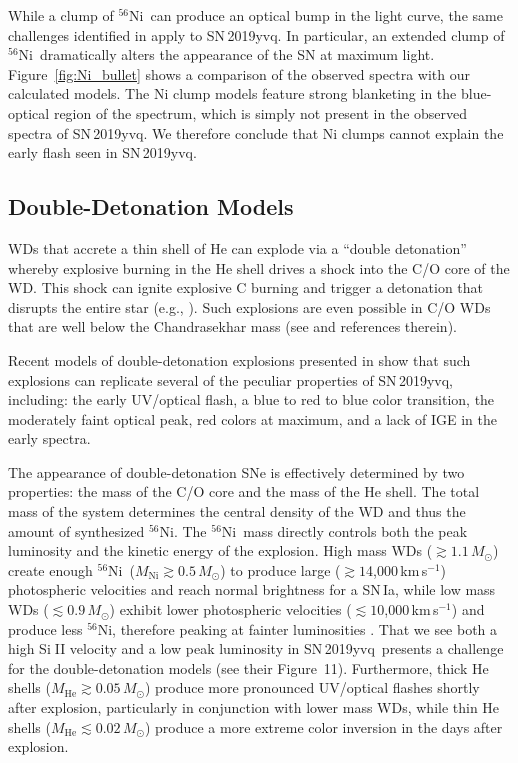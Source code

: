 \documentclass[twocolumn]{aastex63}
\def\ion#1#2{#1$\;${\footnotesize\rm{#2}}\relax}
\newcommand{\kms}{km\,s$^{-1}$}
\newcommand{\radni}{$^{56}$Ni}
\newcommand{\sn}{SN\,2019yvq}
\begin{document}
While a clump of \radni\ can produce an optical bump in the light curve, the
same challenges identified in \citet{Magee20a} apply to \sn. In particular, an
extended clump of \radni\ dramatically alters the appearance of the SN at
maximum light. Figure~\ref{fig:Ni_bullet} shows a comparison of the observed
spectra with our calculated models. The Ni clump models feature strong
blanketing in the blue-optical region of the spectrum, which is simply not
present in the observed spectra of \sn. We therefore conclude that Ni clumps
cannot explain the early flash seen in \sn.

\subsection{Double-Detonation Models}

WDs that accrete a thin shell of He can explode via a ``double detonation''
whereby explosive burning in the He shell drives a shock into the C/O core of
the WD. This shock can ignite explosive C burning and trigger a detonation
that disrupts the entire star (e.g., \citealt{Nomoto82,Nomoto82a,Woosley94}).
Such explosions are even possible in C/O WDs that are well below the
Chandrasekhar mass (see \citealt{Fink07, Fink10} and references therein).

Recent models of double-detonation explosions presented in \citet{Polin19}
show that such explosions can replicate several of the peculiar properties of
\sn, including: the early UV/optical flash, a blue to red to blue color
transition, the moderately faint optical peak, red colors at maximum, and a
lack of IGE in the early spectra.

The appearance of double-detonation SNe is effectively determined by two
properties: the mass of the C/O core and the mass of the He shell. The total
mass of the system determines the central density of the WD and thus the
amount of synthesized \radni. The \radni\ mass directly controls both the peak
luminosity and the kinetic energy of the explosion. High mass WDs ($\gtrsim
1.1\,M_\odot$) create enough \radni\ ($M_\mathrm{Ni} \gtrsim 0.5\,M_\odot$) to
produce large ($\gtrsim 1$4,000\,\kms) photospheric velocities and reach
normal brightness for a SN\,Ia, while low mass WDs ($\lesssim 0.9\,M_\odot$)
exhibit lower photospheric velocities ($\lesssim 1$0,000\,\kms) and produce
less \radni, therefore peaking at fainter luminosities \citep{Polin19}. That
we see both a high \ion{Si}{II} velocity and a low peak luminosity in \sn\
presents a challenge for the \citet{Polin19} double-detonation models (see
their Figure~11). Furthermore, thick He shells ($M_\mathrm{He} \gtrsim
0.05\,M_\odot$) produce more pronounced UV/optical flashes shortly after
explosion, particularly in conjunction with lower mass WDs, while thin He
shells ($M_\mathrm{He} \lesssim 0.02\,M_\odot$) produce a more extreme color
inversion in the days after explosion.
\end{document}
